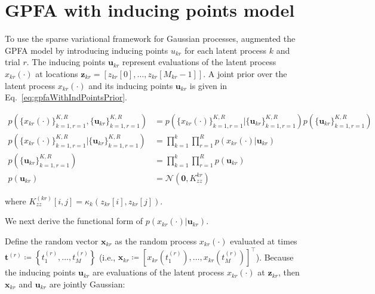 \documentclass[12pt]{article}
\begin{document}
\section{GPFA with inducing points model}

To use the sparse variational framework for Gaussian processes,
\cite{dunckerAndSahani18} augmented the GPFA model by introducing inducing
points $u_{kr}$ for each latent process $k$ and trial $r$. The inducing points
$\mathbf{u}_{kr}$ represent evaluations of the latent process $x_{kr}(\cdot)$
at locations $\mathbf{z}_{kr}=\left[z_{kr}[0],\ldots,z_{kr}[M_{kr}-1]\right]$.
A joint prior over the latent process $x_{kr}(\cdot)$ and its inducing points
$\mathbf{u}_{kr}$ is given in Eq.~\ref{eq:gpfaWithIndPointsPrior}.

\begin{equation}
    \begin{aligned}
        p(\{x_{kr}(\cdot)\}_{k=1,r=1}^{K,R},\{\mathbf{u}_{kr}\}_{k=1,r=1}^{K,R}) &= p(\{x_{kr}(\cdot)\}_{k=1,r=1}^{K,R}|\{\mathbf{u}_{kr}\}_{k=1,r=1}^{K,R})p(\{\mathbf{u}_{kr}\}_  {k=1,r=1}^{K,R})\\
        p(\{x_{kr}(\cdot)\}_{k=1,r=1}^{K,R}|\{\mathbf{u}_{kr}\}_  {k=1,r=1}^{K,R}) &= \prod_{k=1}^k\prod_{r=1}^{R}p(x_{kr}(\cdot)|\mathbf{u}_{kr})\\
        p(\{\mathbf{u}_{kr}\}_{k=1,r=1}^{K,R})&=\prod_{k=1}^k\prod_{r=1}^{R}p(\mathbf{u}_{kr})\\
        p(\mathbf{u}_{kr})&=\mathcal{N}(\mathbf{0},K^{kr}_{zz})
    \end{aligned}
    \label{eq:gpfaWithIndPointsPrior}
\end{equation}

\noindent where $K_{zz}^{(kr)}[i,j]=\kappa_k(z_{kr}[i],z_{kr}[j])$.

We next derive the functional form of $p(x_{kr}(\cdot)|\mathbf{u}_{kr})$.

Define the random vector $\mathbf{x}_{kr}$ as the random process
$x_{kr}(\cdot)$ evaluated at times
$\mathbf{t}^{(r)}\coloneqq\left\{t_1^{(r)},\ldots,t_M^{(r)}\right\}$ (i.e.,
$\mathbf{x}_{kr}\coloneqq[x_{kr}(t_1^{(r)}),\ldots,x_{kr}(t_M^{(r)})]^\intercal$).
Because the inducing points $\mathbf{u}_{kr}$ are evaluations of the
latent process $x_{kr}(\cdot)$ at $\mathbf{z}_{kr}$, then $\mathbf{x}_{kr}$ and
$\mathbf{u}_{kr}$ are jointly Gaussian:
\end{document}
